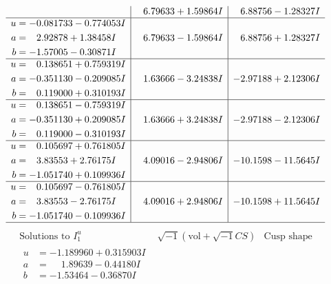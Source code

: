 \documentclass[1p]{elsarticle_modified}
\theoremstyle{definition}
\newcommand{\I}{\sqrt{-1}}
\begin{document}
$$\begin{array}{c|c|c}
 & \phantom{-}6.79633 + 1.59864 I & \phantom{-}6.88756 - 1.28327 I \\ \hline\begin{aligned}
u &= -0.081733 - 0.774053 I \\
a &= \phantom{-}2.92878 + 1.38458 I \\
b &= -1.57005 - 0.30871 I\end{aligned}
 & \phantom{-}6.79633 - 1.59864 I & \phantom{-}6.88756 + 1.28327 I \\ \hline\begin{aligned}
u &= \phantom{-}0.138651 + 0.759319 I \\
a &= -0.351130 - 0.209085 I \\
b &= \phantom{-}0.119000 + 0.310193 I\end{aligned}
 & \phantom{-}1.63666 - 3.24838 I & -2.97188 + 2.12306 I \\ \hline\begin{aligned}
u &= \phantom{-}0.138651 - 0.759319 I \\
a &= -0.351130 + 0.209085 I \\
b &= \phantom{-}0.119000 - 0.310193 I\end{aligned}
 & \phantom{-}1.63666 + 3.24838 I & -2.97188 - 2.12306 I \\ \hline\begin{aligned}
u &= \phantom{-}0.105697 + 0.761805 I \\
a &= \phantom{-}3.83553 + 2.76175 I \\
b &= -1.051740 + 0.109936 I\end{aligned}
 & \phantom{-}4.09016 - 2.94806 I & -10.1598 - 11.5645 I \\ \hline\begin{aligned}
u &= \phantom{-}0.105697 - 0.761805 I \\
a &= \phantom{-}3.83553 - 2.76175 I \\
b &= -1.051740 - 0.109936 I\end{aligned}
 & \phantom{-}4.09016 + 2.94806 I & -10.1598 + 11.5645 I\\
 \hline 
 \end{array}$$\newpage$$\begin{array}{c|c|c}  
\text{Solutions to }I^u_{1}& \I (\text{vol} + \sqrt{-1}CS) & \text{Cusp shape}\\
 \hline 
\begin{aligned}
u &= -1.189960 + 0.315903 I \\
a &= \phantom{-}1.89639 - 0.44180 I \\
b &= -1.53464 - 0.36870 I\end{aligned}

\end{array}$$
\end{document}

